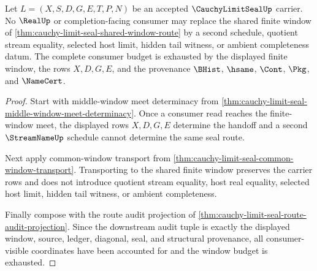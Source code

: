 \begin{theorem}
\label{thm:cauchy-limit-seal-window-budget-exhaustion}
Let $L=(X,S,D,G,E,T,P,N)$ be an accepted $\CauchyLimitSealUp$ carrier. No $\RealUp$ or completion-facing consumer may replace the shared finite window of \autoref{thm:cauchy-limit-seal-shared-window-route} by a second schedule, quotient stream equality, selected host limit, hidden tail witness, or ambient completeness datum. The complete consumer budget is exhausted by the displayed finite window, the rows $X,D,G,E$, and the provenance $\BHist$, $\hsame$, $\Cont$, $\Pkg$, and $\NameCert$.
\end{theorem}
\begin{proof}
Start with middle-window meet determinacy from \autoref{thm:cauchy-limit-seal-middle-window-meet-determinacy}. Once a consumer read reaches the finite-window meet, the displayed rows $X,D,G,E$ determine the handoff and a second $\StreamNameUp$ schedule cannot determine the same seal route.

Next apply common-window transport from \autoref{thm:cauchy-limit-seal-common-window-transport}. Transporting to the shared finite window preserves the carrier rows and does not introduce quotient stream equality, host real equality, selected host limit, hidden tail witness, or ambient completeness.

Finally compose with the route audit projection of \autoref{thm:cauchy-limit-seal-route-audit-projection}. Since the downstream audit tuple is exactly the displayed window, source, ledger, diagonal, seal, and structural provenance, all consumer-visible coordinates have been accounted for and the window budget is exhausted.
\end{proof}

